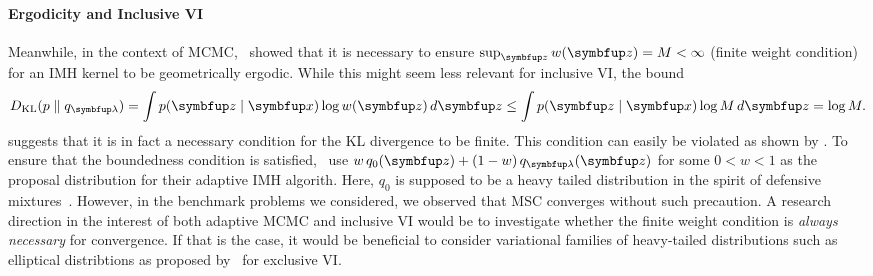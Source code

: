 \vspace{-0.1in}
\paragraph{Ergodicity and Inclusive VI}
Meanwhile, in the context of MCMC,~\citet{10.2307/2242610} showed that it is necessary to ensure \(\sup_{\vz} w(\vz) = M < \infty\) (finite weight condition) for an IMH kernel to be geometrically ergodic.
While this might seem less relevant for inclusive VI, the bound
\begin{align}
  \DKL{p}{q_{\vlambda}} = \int p(\vz\mid\vx) \log w(\vz)\,d\vz \leq \int p(\vz\mid\vx) \log M \, d\vz = \log M.
\end{align}
suggests that it is in fact a necessary condition for the KL divergence to be finite.
This condition can easily be violated as shown by \citet{10.1007/s11222-008-9110-y}.
To ensure that the boundedness condition is satisfied,~\citet{giordani_adaptive_2010, holden_adaptive_2009} use \(w\,q_0(\vz) + (1-w)\,q_{\vlambda}(\vz)\) for some \(0<w<1\) as the proposal distribution for their adaptive IMH algorith.
Here, \(q_0\) is supposed to be a heavy tailed distribution in the spirit of defensive mixtures~\citep{hesterberg_weighted_1995}.
However, in the benchmark problems we considered, we observed that MSC converges without such precaution.
A research direction in the interest of both adaptive MCMC and inclusive VI would be to investigate whether the finite weight condition is \textit{always necessary} for convergence.
If that is the case, it would be beneficial to consider variational families of heavy-tailed distributions such as elliptical distribtions as proposed by~\citet{NEURIPS2018_25db67c5} for exclusive VI.


